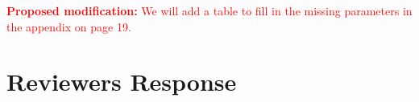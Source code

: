 \documentclass[12pt,one-column]{article}
\begin{document}
\noindent\textcolor{red}{\textbf{Proposed modification: }
We will add a table to fill in the missing parameters in the appendix on page 19.
}

	
\section{Reviewers Response}
\end{document}
